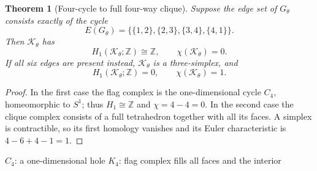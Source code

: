 \documentclass[11pt,a4paper]{article}
\numberwithin{equation}{section}
\newtheorem{theorem}[definition]{Theorem}
\theoremstyle{remark}
\newcommand{\Z}{\mathbb{Z}}
\newcommand{\K}{\mathcal{K}}
\newcommand{\1}{\mathbf{1}}
\begin{document}
\begin{theorem}[Four-cycle to full four-way clique]\label{thm:four}
Suppose the edge set of $G_\theta$ consists exactly of the cycle
\begin{equation*}
E(G_\theta)=\bigl\{\{1,2\},\{2,3\},\{3,4\},\{4,1\}\bigr\}.
\end{equation*}
Then $\K_\theta$ has
\begin{equation}
H_1(\K_\theta;\Z)\cong\Z,\qquad
\chi(\K_\theta)=0.
\end{equation}
If all six edges are present instead, $\K_\theta$ is a
three-simplex, and
\begin{equation}
H_1(\K_\theta;\Z)=0,\qquad
\chi(\K_\theta)=1.
\end{equation}
\end{theorem}
\begin{proof}
In the first case the flag complex is the one-dimensional cycle
$C_4$, homeomorphic to $S^1$; thus $H_1\cong\Z$ and
$\chi=4-4=0$.  In the second case the clique complex consists of a
full tetrahedron together with all its faces.  A simplex is
contractible, so its first homology vanishes and its Euler
characteristic is $4-6+4-1=1$.
\end{proof}

\begin{center}

\smallskip
\small $C_4$: a one-dimensional hole \hspace{23mm}
$K_4$: flag complex fills all faces and the interior
\end{center}
\end{document}

